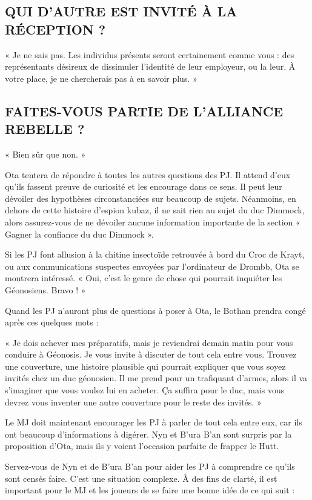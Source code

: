 \documentclass[a4paper,10pt,twoside,twocolumn,openany]{book}
\begin{document}
\subsection{QUI D’AUTRE EST INVITÉ À LA RÉCEPTION ?}
« Je ne sais pas. Les individus présents seront certainement comme vous : des représentants désireux de dissimuler l’identité de leur employeur, ou la leur. À votre
place, je ne chercherais pas à en savoir plus. »

\subsection{FAITES-VOUS PARTIE DE L’ALLIANCE REBELLE ?}
« Bien sûr que non. »

Ota tentera de répondre à toutes les autres questions
des PJ. Il attend d’eux qu’ils fassent preuve de curiosité et les encourage dans ce sens. Il peut leur dévoiler
des hypothèses circonstanciées sur beaucoup de sujets.
Néanmoins, en dehors de cette histoire d’espion kubaz, il
ne sait rien au sujet du duc Dimmock, alors assurez-vous
de ne dévoiler aucune information importante de la section « Gagner la confiance du duc Dimmock ».

Si les PJ font allusion à la chitine insectoïde retrouvée à bord du Croc de Krayt, ou aux communications
suspectes envoyées par l’ordinateur de Drombb, Ota se
montrera intéressé. « Oui, c’est le genre de chose qui
pourrait inquiéter les Géonosiens. Bravo ! »

\subtitle{FIN DE LA RENCONTRE}

Quand les PJ n’auront plus de questions à poser à Ota, le
Bothan prendra congé après ces quelques mots :
\begin{quotebox}
« Je dois achever mes préparatifs, mais je reviendrai demain matin pour vous conduire à Géonosis.
Je vous invite à discuter de tout cela entre vous.
Trouvez une couverture, une histoire plausible qui
pourrait expliquer que vous soyez invités chez un
duc géonosien. Il me prend pour un trafiquant
d’armes, alors il va s’imaginer que vous voulez lui
en acheter. Ça suffira pour le duc, mais vous devrez vous inventer une autre couverture pour le
reste des invités. »
\end{quotebox}

Le MJ doit maintenant encourager les PJ à parler de
tout cela entre eux, car ils ont beaucoup d’informations
à digérer. Nyn et B’ura B’an sont surpris par la proposition d’Ota, mais ils y voient l’occasion parfaite de frapper le Hutt.

Servez-vous de Nyn et de B’ura B’an pour aider les PJ à
comprendre ce qu’ils sont censés faire. C’est une situation
complexe. À des fins de clarté, il est important pour le MJ
et les joueurs de se faire une bonne idée de ce qui suit :
\end{document}
